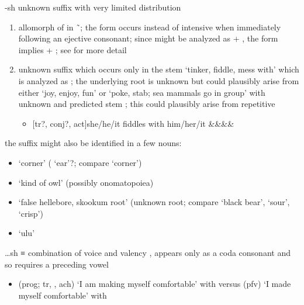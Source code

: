 \begin{morphdesc}[resume*=alphalist]
\item[-sh]\label{m:-sh}
	unknown suffix with very limited distribution
	\begin{enumerate}
	\item	allomorph of  in  \~\ ;
		the form  occurs instead of intensive 
			when immediately following an ejective consonant;
		since  might be analyzed as  + ,
		the  form implies  + ;
		see  for more detail
	\item	unknown suffix which occurs only in the stem 
			 ‘tinker, fiddle, mess with’
			which is analyzed as ;
		the underlying root is unknown but could plausibly
			arise from either  ‘joy, enjoy, fun’
			or  ‘poke, stab; sea mammals go in group’
			with unknown 
			and predicted stem ;
		this  could plausibly arise from repetitive 
		\begin{itemize}
		\item	{}[tr?, conj?, act]{she/he/it fiddles with him/her/it}
					{&&&\·\xx{var}&\·}
		\end{itemize}
	\end{enumerate}
	the  suffix might also be identified in a few nouns:
	\begin{itemize}
	\item	{} ‘corner’
		( ‘ear’?; compare  ‘corner’)
	\item	{} ‘kind of owl’
		(possibly onomatopoiea)
	\item	{} ‘false hellebore, skookum root’
		(unknown root; compare  ‘black bear’,
		 ‘sour’,
		 ‘crisp’)
	\item	{} ‘ulu’
	\end{itemize}

\item[…sh]\label{m:…sh}
	≡ 
	combination of voice 
		and valency ,
	appears only as a coda consonant and so requires a preceding vowel
	\begin{itemize}
	\item	{} (prog; tr, , ach) ‘I am making myself comfortable’
			with \newline
		versus  (pfv) ‘I made myself comfortable’
			with 
	\end{itemize}


\end{morphdesc}
